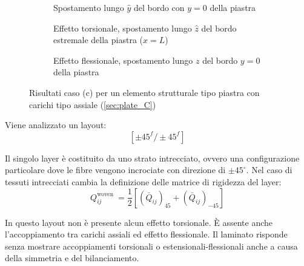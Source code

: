 \documentclass[a4paper,num-refs]{oup-contemporary}
\begin{document}
\begin{figure}[bt!]
	\centering
	
	\begin{subfigure}[t]{0.3\textwidth}
		\centering
		\caption{Spostamento lungo $\hat y$ del bordo con $y=0$ della piastra}
		
	\end{subfigure}
	\hfill
	\begin{subfigure}[t]{0.3\textwidth}
		\centering
		
		\caption{Effetto torsionale, spostamento lungo $\hat z$ del bordo estremale della piastra ($x=L$)}
		
	\end{subfigure}
	\hfill
	\begin{subfigure}[t]{0.3\textwidth}
		\centering
		\caption{Effetto flessionale, spostamento lungo $z$ del bordo $y=0$ della piastra}
		
	\end{subfigure}
	\hfill
	\caption{Risultati caso (c) per un elemento strutturale tipo piastra con carichi tipo assiale (\cref{sec:plate_C})}
	\label{fig:plate_C_axial_load}
\end{figure}

Viene analizzato un layout:
\begin{equation}
\left[\pm 45^{f} / \pm 45^{f}\right]
\end{equation}

Il singolo layer è costituito da uno strato intrecciato, ovvero una configurazione particolare dove le fibre vengono incrociate con direzione di $\pm 45^\circ$. Nel caso di tessuti intrecciati cambia la definizione delle matrice di rigidezza del layer:
\begin{equation}
Q_{i j}^{\text {woven }}=\frac{1}{2}\left[\left(\bar{Q}_{i j}\right)_{45}+\left(\bar{Q}_{i j}\right)_{-45}\right]
\end{equation}

In questo layout non è presente alcun effetto torsionale. 
È assente anche l'accoppiamento tra carichi assiali ed effetto flessionale. 
Il laminato risponde senza mostrare accoppiamenti torsionali o estensionali-flessionali anche a causa della simmetria e del bilanciamento.
 
\end{document}
